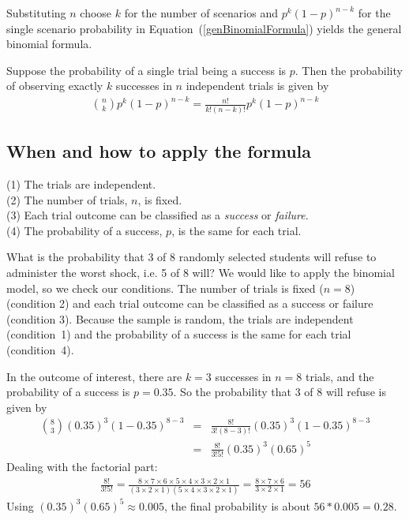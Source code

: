 Substituting $n$ choose $k$ for the number of scenarios and $p^k(1-p)^{n-k}$ for the single scenario probability in Equation~(\ref{genBinomialFormula}) yields the general binomial formula.


\begin{termBox}{ Suppose the probability of a single trial being a success is $p$. Then the probability of observing exactly $k$ successes in $n$ independent trials is given by\vspace{-1mm}
\begin{eqnarray}
{n\choose k}p^k(1-p)^{n-k} = \frac{n!}{k!(n-k)!}p^k(1-p)^{n-k}
\label{binomialFormula}
\end{eqnarray}
}
\end{termBox}

\subsection{When and how to apply the formula}

\begin{tipBox}{
(1) The trials are independent. \\
(2) The number of trials, $n$, is fixed. \\
(3) Each trial outcome can be classified as a \emph{success} or \emph{failure}. \\
(4) The probability of a success, $p$, is the same for each trial.}
\end{tipBox}

\begin{example}{What is the probability that 3 of 8 randomly selected students will refuse to administer the worst shock, i.e. 5 of 8 will?}
We would like to apply the binomial model, so we check our conditions. The number of trials is fixed ($n=8$) (condition 2) and each trial outcome can be classified as a success or failure (condition 3). Because the sample is random, the trials are independent (condition~1) and the probability of a success is the same for each trial (condition~4).

In the outcome of interest, there are $k=3$ successes in $n=8$ trials, and the probability of a success is $p=0.35$. So the probability that 3 of 8 will refuse is given by
\begin{eqnarray*}
{ 8 \choose 3}(0.35)^3(1-0.35)^{8-3}
	&=& \frac{8!}{3!(8-3)!}(0.35)^3(1-0.35)^{8-3} \\
	&=& \frac{8!}{3!5!}(0.35)^3(0.65)^5
\end{eqnarray*}
Dealing with the factorial part:
\begin{eqnarray*}
\frac{8!}{3!5!} = \frac{8\times7\times6\times5\times4\times3\times2\times1}{(3\times2\times1)(5\times4\times3\times2\times1)} = \frac{8\times7\times6}{3\times2\times1} = 56
\end{eqnarray*}
Using $(0.35)^3(0.65)^5 \approx 0.005$, the final probability is about $56*0.005 = 0.28$.
\end{example}

